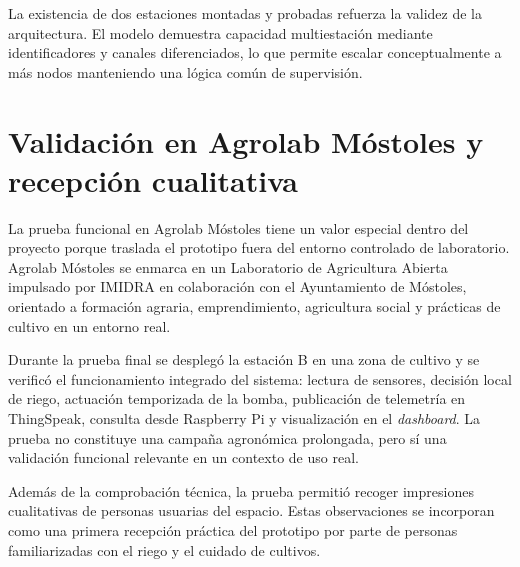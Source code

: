 La existencia de dos estaciones montadas y probadas refuerza la validez de la arquitectura. El modelo demuestra capacidad multiestación mediante identificadores y canales diferenciados, lo que permite escalar conceptualmente a más nodos manteniendo una lógica común de supervisión.

\section{Validación en Agrolab Móstoles y recepción cualitativa}
\label{sec:validacion_recepcion_agrolab}

La prueba funcional en Agrolab Móstoles tiene un valor especial dentro del proyecto porque traslada el prototipo fuera del entorno controlado de laboratorio. Agrolab Móstoles se enmarca en un Laboratorio de Agricultura Abierta impulsado por IMIDRA en colaboración con el Ayuntamiento de Móstoles, orientado a formación agraria, emprendimiento, agricultura social y prácticas de cultivo en un entorno real.

Durante la prueba final se desplegó la estación B en una zona de cultivo y se verificó el funcionamiento integrado del sistema: lectura de sensores, decisión local de riego, actuación temporizada de la bomba, publicación de telemetría en ThingSpeak, consulta desde Raspberry Pi y visualización en el \textit{dashboard}. La prueba no constituye una campaña agronómica prolongada, pero sí una validación funcional relevante en un contexto de uso real.

Además de la comprobación técnica, la prueba permitió recoger impresiones cualitativas de personas usuarias del espacio. Estas observaciones se incorporan como una primera recepción práctica del prototipo por parte de personas familiarizadas con el riego y el cuidado de cultivos.

